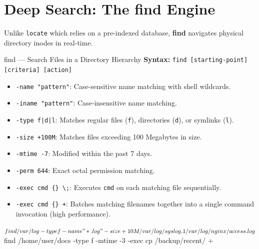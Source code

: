 \section{Deep Search: The find Engine}
Unlike \texttt{locate} which relies on a pre-indexed database, \textbf{find} navigates physical directory inodes in real-time.
\begin{commandbox}{find --- Search Files in a Directory Hierarchy}
\textbf{Syntax:} \texttt{find [starting-point] [criteria] [action]}
\begin{itemize}[leftmargin=1.5em]
    \item \texttt{-name "pattern"}: Case-sensitive name matching with shell wildcards.
    \item \texttt{-iname "pattern"}: Case-insensitive name matching.
    \item \texttt{-type f|d|l}: Matches regular files (\texttt{f}), directories (\texttt{d}), or symlinks (\texttt{l}).
    \item \texttt{-size +100M}: Matches files exceeding 100 Megabytes in size.
    \item \texttt{-mtime -7}: Modified within the past 7 days.
    \item \texttt{-perm 644}: Exact octal permission matching.
    \item \texttt{-exec cmd \{\} \textbackslash;}: Executes \texttt{cmd} on each matching file sequentially.
    \item \texttt{-exec cmd \{\} +}: Batches matching filenames together into a single command invocation (high performance).
\end{itemize}
\end{commandbox}

\begin{terminalbox}
$ find /var/log -type f -name "*.log" -size +10M
/var/log/syslog.1
/var/log/nginx/access.log

$ find /home/user/docs -type f -mtime -3 -exec cp {} /backup/recent/ +
\end{terminalbox}

